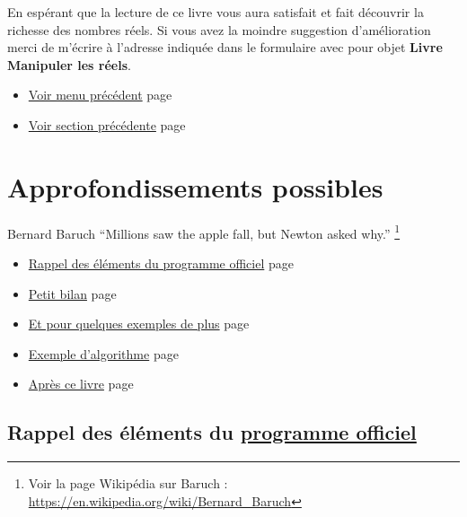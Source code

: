 \documentclass[a4paper,11pt]{book}
\begin{document}
En espérant que la lecture de ce livre vous aura satisfait et fait
découvrir la richesse des nombres réels. Si vous avez la moindre
suggestion d'amélioration merci de m'écrire à l'adresse
indiquée dans le formulaire avec pour objet \textbf{Livre Manipuler les
réels}.


\begin{itemize}
\item \hyperref[org3aca2a1]{Voir menu précédent}
page~\pageref{page:algos-menu}
\item \hyperref[org25f4c17]{Voir section précédente}
page~\pageref{page:sec5.2explain}
\end{itemize}


\clearpage

\part{Approfondissements possibles}
\label{sec:org61bb368}
\label{org2f59ee6}
\label{page:sec6deep}

\begin{myquote}{Bernard Baruch}
\enquote{Millions saw the apple fall, but Newton asked why.}
\footnote{Voir la page Wikipédia sur Baruch : \url{https://en.wikipedia.org/wiki/Bernard_Baruch}}
\end{myquote}




\clearpage

\label{org82a5705}
\label{page:deeps-menu}
\begin{itemize}
\item \hyperref[org1e7ea68]{Rappel des éléments du programme officiel} page \pageref{page:sec6.1review}
\item \hyperref[org419d7e0]{Petit bilan} page \pageref{page:sec6.2bilan}
\item \hyperref[orgde7e38b]{Et pour quelques exemples de plus} page \pageref{page:sec6.3exs}
\item \hyperref[org091b4be]{Exemple d'algorithme} page \pageref{page:sec5algo}
\item \hyperref[org16db6b7]{Après ce livre} page \pageref{page:sec7after}
\end{itemize}


\clearpage

\chapter{Rappel des éléments du \href{https://eduscol.education.fr/document/24553/download}{programme officiel}}
\label{sec:org207be03}
\label{org1e7ea68}
\label{page:sec6.1review}
\end{document}
